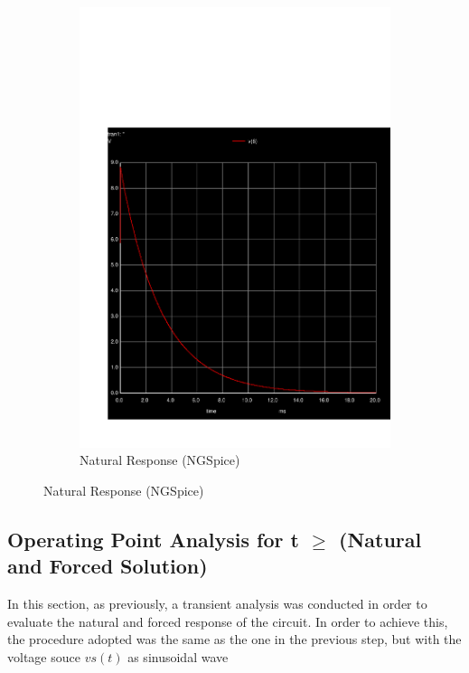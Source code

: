 \begin{figure}[h]
\begin{subfigure}{0.4\textwidth}
\includegraphics[width=\textwidth]{sim_3.pdf}
\caption{Natural Response (NGSpice)}
\label{fig:second}
\end{subfigure}

\end{figure}
 
\subsection{Operating Point Analysis for t $\geq$ (Natural and Forced Solution)}
In this section, as previously, a transient analysis was conducted in order to evaluate the natural and forced response of the circuit. In order to achieve this, the procedure adopted was the same as the one in the previous step, but with the voltage souce $vs(t)$ as sinusoidal wave %

